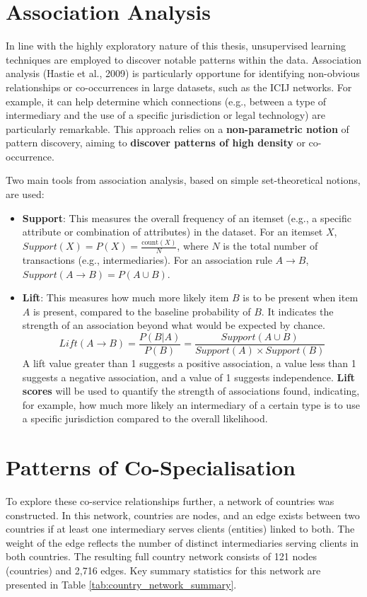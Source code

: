 \section{Association Analysis}
\label{subsec:unsupervised_learning}
In line with the highly exploratory nature of this thesis, unsupervised learning techniques are employed to discover notable patterns within the data. Association analysis (Hastie et al., 2009) is particularly opportune for identifying non-obvious relationships or co-occurrences in large datasets, such as the ICIJ networks. For example, it can help determine which connections (e.g., between a type of intermediary and the use of a specific jurisdiction or legal technology) are particularly remarkable. This approach relies on a \textbf{non-parametric notion} of pattern discovery, aiming to \textbf{discover patterns of high density} or co-occurrence.

Two main tools from association analysis, based on simple set-theoretical notions, are used:
\begin{itemize}
    \item \textbf{Support}: This measures the overall frequency of an itemset (e.g., a specific attribute or combination of attributes) in the dataset. For an itemset $X$, $Support(X) = P(X) = \frac{\text{count}(X)}{N}$, where $N$ is the total number of transactions (e.g., intermediaries). For an association rule $A \rightarrow B$, $Support(A \rightarrow B) = P(A \cup B)$.
    \item \textbf{Lift}: This measures how much more likely item $B$ is to be present when item $A$ is present, compared to the baseline probability of $B$. It indicates the strength of an association beyond what would be expected by chance.
    \begin{equation}
        Lift(A \rightarrow B) = \frac{P(B|A)}{P(B)} = \frac{Support(A \cup B)}{Support(A) \times Support(B)}
    \end{equation}
    A lift value greater than 1 suggests a positive association, a value less than 1 suggests a negative association, and a value of 1 suggests independence. \textbf{Lift scores} will be used to quantify the strength of associations found, indicating, for example, how much more likely an intermediary of a certain type is to use a specific jurisdiction compared to the overall likelihood.
\end{itemize}




\section{Patterns of Co-Specialisation}
To explore these co-service relationships further, a network of countries was constructed. In this network, countries are nodes, and an edge exists between two countries if at least one intermediary serves clients (entities) linked to both. The weight of the edge reflects the number of distinct intermediaries serving clients in both countries. The resulting full country network consists of 121 nodes (countries) and 2,716 edges. Key summary statistics for this network are presented in Table \ref{tab:country_network_summary}. 

